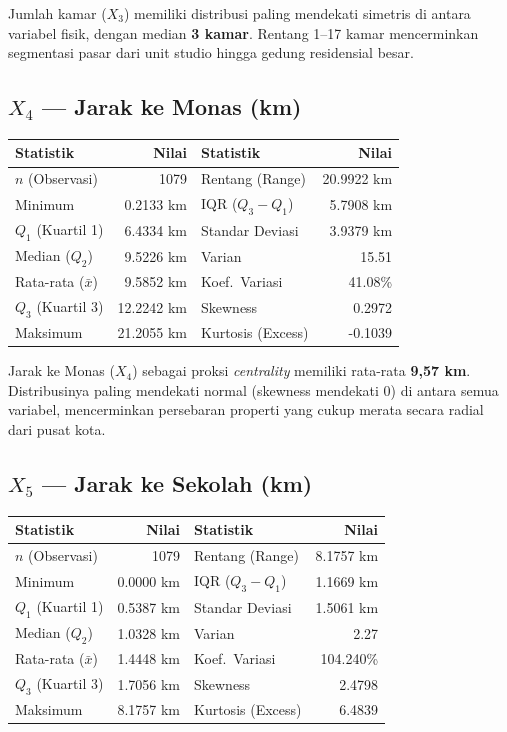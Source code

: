 \documentclass[12pt,a4paper]{article}
\begin{document}
\noindent Jumlah kamar ($X_3$) memiliki distribusi paling mendekati simetris di antara variabel fisik, dengan median \textbf{3 kamar}. Rentang 1--17 kamar mencerminkan segmentasi pasar dari unit studio hingga gedung residensial besar.


\subsection{\texorpdfstring{$X_4$}{X4} --- Jarak ke Monas (km)}
\begin{center}
\begin{tabular}{|l|r||l|r|}
\hline
\textbf{Statistik} & \textbf{Nilai} & \textbf{Statistik} & \textbf{Nilai} \\
\hline
$n$ (Observasi) & 1079 & Rentang (Range) & 20.9922 km \\
Minimum & 0.2133 km & IQR ($Q_3 - Q_1$) & 5.7908 km \\
$Q_1$ (Kuartil 1) & 6.4334 km & Standar Deviasi & 3.9379 km \\
Median ($Q_2$) & 9.5226 km & Varian & 15.51 \\
Rata-rata ($\bar{x}$) & 9.5852 km & Koef.~Variasi & 41.08\% \\
$Q_3$ (Kuartil 3) & 12.2242 km & Skewness & 0.2972 \\
Maksimum & 21.2055 km & Kurtosis (Excess) & -0.1039 \\
\hline
\end{tabular}
\end{center}

\noindent Jarak ke Monas ($X_4$) sebagai proksi \textit{centrality} memiliki rata-rata \textbf{9,57 km}. Distribusinya paling mendekati normal (skewness mendekati 0) di antara semua variabel, mencerminkan persebaran properti yang cukup merata secara radial dari pusat kota.


\subsection{\texorpdfstring{$X_5$}{X5} --- Jarak ke Sekolah (km)}
\begin{center}
\begin{tabular}{|l|r||l|r|}
\hline
\textbf{Statistik} & \textbf{Nilai} & \textbf{Statistik} & \textbf{Nilai} \\
\hline
$n$ (Observasi) & 1079 & Rentang (Range) & 8.1757 km \\
Minimum & 0.0000 km & IQR ($Q_3 - Q_1$) & 1.1669 km \\
$Q_1$ (Kuartil 1) & 0.5387 km & Standar Deviasi & 1.5061 km \\
Median ($Q_2$) & 1.0328 km & Varian & 2.27 \\
Rata-rata ($\bar{x}$) & 1.4448 km & Koef.~Variasi & 104.240\% \\
$Q_3$ (Kuartil 3) & 1.7056 km & Skewness & 2.4798 \\
Maksimum & 8.1757 km & Kurtosis (Excess) & 6.4839 \\
\hline
\end{tabular}
\end{center}
\end{document}
